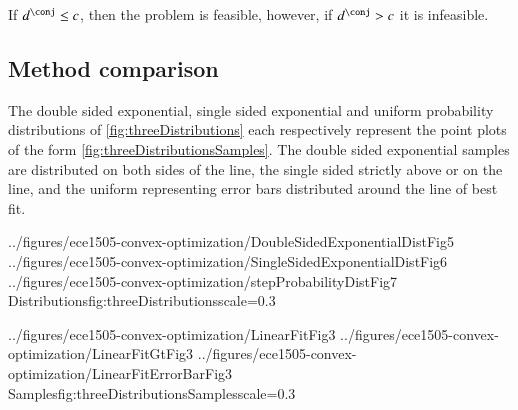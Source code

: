 If \( d^\conj \le c \), then the problem is feasible, however, if \( d^\conj > c \) it is infeasible.
\subsection{Method comparison}
The double sided exponential, single sided exponential and uniform probability distributions of \cref{fig:threeDistributions} each respectively represent the point plots of the form \cref{fig:threeDistributionsSamples}.  The double sided exponential samples are distributed on both sides of the line, the single sided strictly above or on the line, and the uniform representing error bars distributed around the line of best fit.

\imageThreeFiguresOneLine
{../figures/ece1505-convex-optimization/DoubleSidedExponentialDistFig5}
{../figures/ece1505-convex-optimization/SingleSidedExponentialDistFig6}
{../figures/ece1505-convex-optimization/stepProbabilityDistFig7}
{Distributions}{fig:threeDistributions}{scale=0.3}

\imageThreeFiguresOneLine
{../figures/ece1505-convex-optimization/LinearFitFig3}
{../figures/ece1505-convex-optimization/LinearFitGtFig3}
{../figures/ece1505-convex-optimization/LinearFitErrorBarFig3}
{Samples}{fig:threeDistributionsSamples}{scale=0.3}
